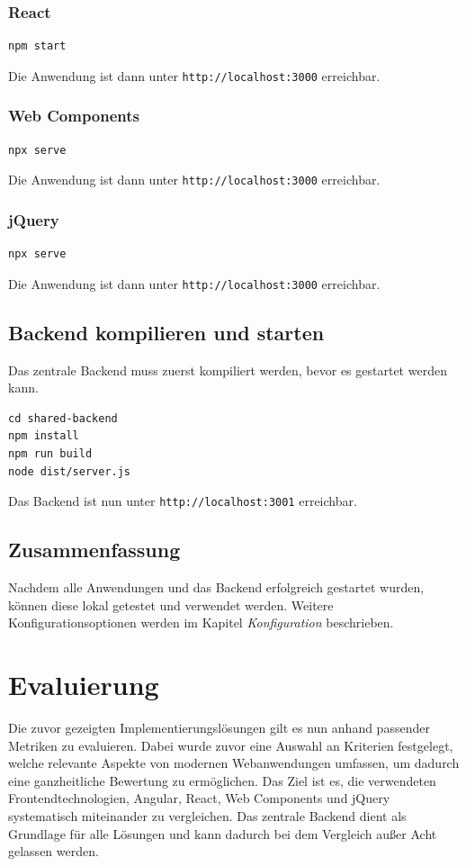 \documentclass[oneside]{ausarbeitung}
\begin{document}
\subsection{React}
\begin{verbatim}
npm start
\end{verbatim}
Die Anwendung ist dann unter \texttt{http://localhost:3000} erreichbar.

\subsection{Web Components}
\begin{verbatim}
npx serve
\end{verbatim}
Die Anwendung ist dann unter \texttt{http://localhost:3000} erreichbar.

\subsection{jQuery}
\begin{verbatim}
npx serve
\end{verbatim}
Die Anwendung ist dann unter \texttt{http://localhost:3000} erreichbar.

\section{Backend kompilieren und starten}
Das zentrale Backend muss zuerst kompiliert werden, bevor es gestartet werden kann.

\begin{verbatim}
cd shared-backend
npm install
npm run build
node dist/server.js
\end{verbatim}

Das Backend ist nun unter \texttt{http://localhost:3001} erreichbar.

\section{Zusammenfassung}
Nachdem alle Anwendungen und das Backend erfolgreich gestartet wurden, können diese lokal getestet und verwendet werden. Weitere Konfigurationsoptionen werden im Kapitel \textit{Konfiguration} beschrieben.

\chapter{Evaluierung}

Die zuvor gezeigten Implementierungslösungen gilt es nun anhand passender Metriken zu evaluieren. Dabei wurde zuvor eine Auswahl an Kriterien festgelegt, welche relevante Aspekte von modernen Webanwendungen umfassen, um dadurch eine ganzheitliche Bewertung zu ermöglichen. Das Ziel ist es, die verwendeten Frontendtechnologien, Angular, React, Web Components und jQuery systematisch miteinander zu vergleichen. Das zentrale Backend dient als Grundlage für alle Lösungen und kann dadurch bei dem Vergleich außer Acht gelassen werden.
\end{document}
